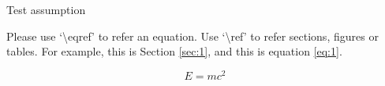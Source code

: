 \begin{tempsection}
    \begin{assumption}
        Test assumption
    \end{assumption}

    Please use `\textbackslash eqref' to refer an equation. Use `\textbackslash ref' to refer sections, figures or tables. For example, this is Section \ref{sec:1}, and this is equation \eqref{eq:1}.

    \begin{equation}
        E = mc^2
        \label{eq:1}
    \end{equation}

\end{tempsection}